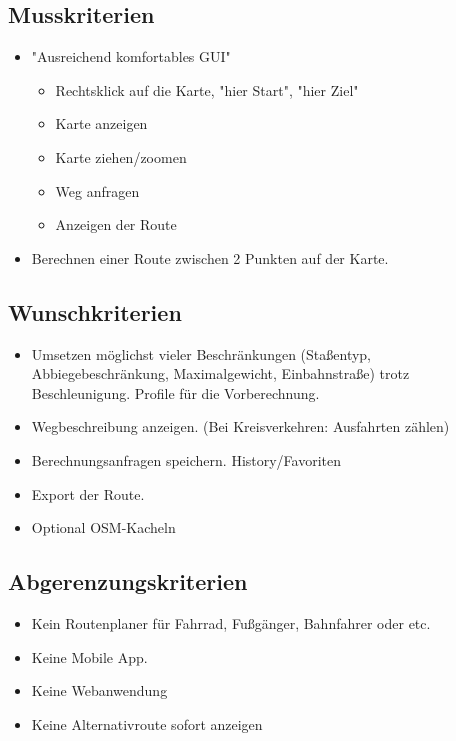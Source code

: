 \documentclass[a4paper, 11pt]{article}
\begin{document}
\subsection{Musskriterien}
\begin{itemize}
\item "Ausreichend komfortables GUI"
\begin{itemize}
\item Rechtsklick auf die Karte, "hier Start", "hier Ziel" %
\item Karte anzeigen
\item Karte ziehen/zoomen
\item Weg anfragen
\item Anzeigen der Route
\end{itemize}
\item Berechnen einer Route zwischen 2 Punkten auf der Karte.
\end{itemize}
\subsection{Wunschkriterien}
\begin{itemize}
\item Umsetzen möglichst vieler Beschränkungen (Staßentyp, Abbiegebeschränkung, 
Maximalgewicht, Einbahnstraße) trotz Beschleunigung. Profile für die Vorberechnung. %

\item Wegbeschreibung anzeigen. (Bei Kreisverkehren: Ausfahrten zählen)
\item Berechnungsanfragen speichern. History/Favoriten
\item Export der Route.

\item Optional OSM-Kacheln

\end{itemize}
\subsection{Abgerenzungskriterien}

\begin{itemize}
\item Kein Routenplaner für Fahrrad, Fußgänger, Bahnfahrer oder etc.
\item Keine Mobile App.
\item Keine Webanwendung
\item Keine Alternativroute sofort anzeigen

\end{itemize}
\end{document}
